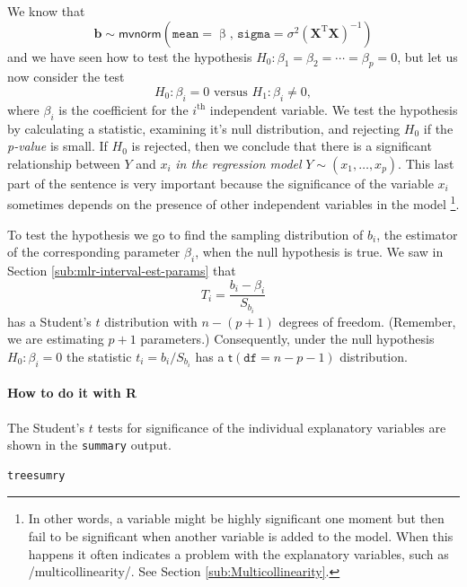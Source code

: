 \documentclass[captions=tableheading]{scrbook}
\begin{document}
We know that
\begin{equation}
\mathbf{b}\sim\mathsf{mvnorm}\left(\mathtt{mean}=\upbeta,\,\mathtt{sigma}=\sigma^{2}\left(\mathbf{X}^{\mathrm{T}}\mathbf{X}\right)^{-1}\right)
\end{equation}
and we have seen how to test the hypothesis $H_{0}:\beta_{1}=\beta_{2}=\cdots=\beta_{p}=0$, but let us now consider the test
\begin{equation}
H_{0}:\beta_{i}=0\mbox{ versus }H_{1}:\beta_{i}\neq0,
\end{equation}
where $\beta_{i}$ is the coefficient for the \(i^{\textrm{th}}\) independent variable. We test the hypothesis by calculating a statistic, examining it's null distribution, and rejecting $H_{0}$ if the \emph{p-value} is small. If $H_{0}$ is rejected, then we conclude that there is a significant relationship between $Y$ and $x_{i}$ \emph{in the regression model} $Y\sim(x_{1},\ldots,x_{p})$. This last part of the sentence is very important because the significance of the variable $x_{i}$ sometimes depends on the presence of other independent variables in the model
\footnote{In other words, a variable might be highly significant one moment but then fail to be significant when another variable is added to the model. When this happens it often indicates a problem with the explanatory variables, such as /multicollinearity/. See Section \ref{sub:Multicollinearity}.}.

To test the hypothesis we go to find the sampling distribution of \( b_{i} \), the estimator of the corresponding parameter \( \beta_{i} \), when the null hypothesis is true. We saw in Section \ref{sub:mlr-interval-est-params} that 
\begin{equation}
T_{i}=\frac{b_{i}-\beta_{i}}{S_{b_{i}}}
\end{equation}
has a Student's $t$ distribution with $n-(p+1)$ degrees of freedom. (Remember, we are estimating $p+1$ parameters.) Consequently, under the null hypothesis $H_{0}:\beta_{i}=0$ the statistic $t_{i}=b_{i}/S_{b_{i}}$ has a $\mathsf{t}(\mathtt{df}=n-p-1)$ distribution.


\paragraph*{How to do it with \textsf{R}}

The Student's $t$ tests for significance of the individual explanatory variables are shown in the \texttt{summary} output.


\begin{verbatim}
treesumry
\end{verbatim}
\end{document}

